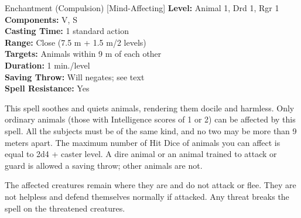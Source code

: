 {Enchantment (Compulsion) [Mind-Affecting]}
{
	\textbf{Level:}
	Animal 1, Drd 1, Rgr 1\\
	\textbf{Components:}
	V, S\\
	\textbf{Casting Time:}
	1 standard action\\
	\textbf{Range:}
	Close (7.5 m + 1.5 m/2 levels)\\
	\textbf{Targets:}
	Animals within 9 m of each other\\
	\textbf{Duration:}
	1 min./level\\
	\textbf{Saving Throw:}
	Will negates; see text\\
	\textbf{Spell Resistance:}
	Yes\\
}
{
	This spell soothes and quiets animals, rendering them docile and harmless. Only ordinary animals (those with Intelligence scores of 1 or 2) can be affected by this spell. All the subjects must be of the same kind, and no two may be more than 9 meters apart. The maximum number of Hit Dice of animals you can affect is equal to 2d4 + caster level. A dire animal or an animal trained to attack or guard is allowed a saving throw; other animals are not.

	The affected creatures remain where they are and do not attack or flee. They are not helpless and defend themselves normally if attacked. Any threat breaks the spell on the threatened creatures.

}
